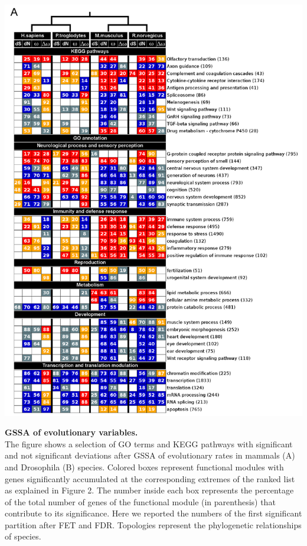 \begin{FPfigure}
\centering 
\includegraphics[width=\textwidth]{tex_source/figures/gssa/table_mammals_2.png}
\caption[GSSA of evolutionary variables.]{{\bf GSSA of evolutionary variables.} \\The figure shows a selection of GO terms and KEGG pathways with significant and not significant deviations after GSSA of evolutionary rates in mammals (A) and Drosophila (B) species. Colored boxes represent functional modules with genes significantly accumulated at the corresponding extremes of the ranked list as explained in Figure 2. The number inside each box represents the percentage of the total number of genes of the functional module (in parenthesis) that contribute to its significance. Here we reported the numbers of the first significant partition after FET and FDR. Topologies represent the phylogenetic relationships of species.} 
\label{fig:tab_gssa}
\end{FPfigure}
